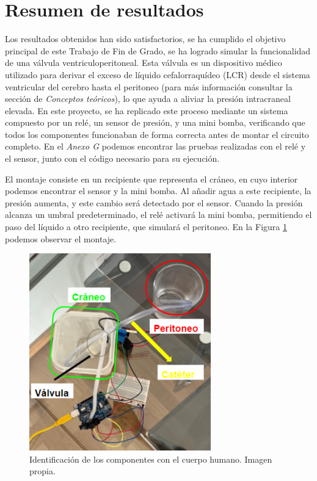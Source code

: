

\section{Resumen de resultados}
Los resultados obtenidos han sido satisfactorios, se ha cumplido el objetivo principal de este Trabajo de Fin de Grado, se ha logrado simular la funcionalidad de una válvula ventriculoperitoneal. Esta válvula es un dispositivo médico utilizado para derivar el exceso de líquido cefalorraquídeo (LCR) desde el sistema ventricular del cerebro hasta el peritoneo (para más información consultar la sección de \textit{Conceptos teóricos}), lo que ayuda a aliviar la presión intracraneal elevada. En este proyecto, se ha replicado este proceso mediante un sistema compuesto por un relé, un sensor de presión, y una mini bomba, verificando que todos los componentes funcionaban de forma correcta antes de montar el circuito completo. En el \textit{Anexo G} podemos encontrar las pruebas realizadas con el relé y el sensor, junto con el código necesario para su ejecución.


El montaje consiste en un recipiente que representa el cráneo, en cuyo interior podemos encontrar el sensor y la mini bomba. Al añadir agua a este recipiente, la presión aumenta, y este cambio será detectado por el sensor. Cuando la presión alcanza un umbral predeterminado, el relé activará la mini bomba, permitiendo el paso del líquido a otro recipiente, que simulará el peritoneo. En la Figura \ref{fig:proyect-realiad} podemos observar el montaje.

\begin{figure}[h]
    \centering
    \includegraphics[width=0.7\textwidth]{img/proyect-realidad.PNG}
    \caption{Identificación de los componentes con el cuerpo humano. Imagen propia.}
    \label{fig:proyect-realiad}
\end{figure}


